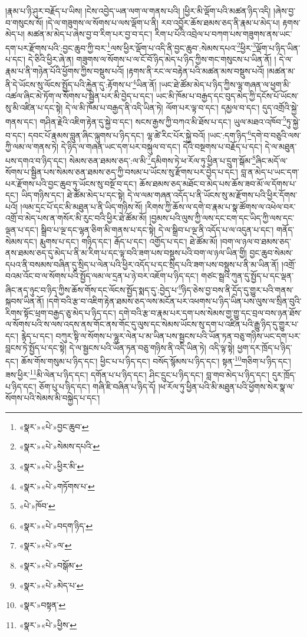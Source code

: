 །རྣམ་པ་ཉི་ཤུར་བརྗོད་པ་ཡིས། །ངེས་འབྱེད་ཡན་ལག་ལ་གནས་པའི། །ཕྱིར་མི་ལྡོག་པའི་མཚན་ཉིད་འདི། །ཞེས་བྱ་བ་གསུངས་སོ། །དེ་ལ་གཟུགས་ལ་སོགས་པ་ལས་ལྡོག་པ་ནི། རབ་འབྱོར་ཆོས་ཐམས་ཅད་ནི་རྣམ་པ་མེད་པ། རྟགས་མེད་པ། མཚན་མ་མེད་པ་ཞེས་བྱ་བ་རིག་པར་བྱ་བ་དང་། རིག་པ་པོའི་འབྲེལ་པ་བཀག་པས་གཟུགས་ནས་ཡང་དག་པར་རྫོགས་པའི་:བྱང་ཆུབ་ཀྱི་བར་\footnote{«སྣར་»«པེ་»བྱང་ཆུབ་}ལས་ཕྱིར་ལྡོག་པ་འདི་ནི་བྱང་ཆུབ་:སེམས་དཔའ་\footnote{«སྣར་»«པེ་»སེམས་དཔའི་}ཕྱིར་\footnote{«སྣར་»«པེ་»ཕྱིར་མི་}ལྡོག་པ་ཉིད་ཡིན་པ་དང་། དེ་ཅིའི་ཕྱིར་ཞེ་ན། གཟུགས་ལ་སོགས་པ་ལ་ངོ་བོ་ཉིད་མེད་པ་ཉིད་ཀྱིས་གང་གསུངས་པ་ཡིན་ནོ། །
དེ་ལ་རྣམ་པ་ནི་གཉེན་པོའི་ཕྱོགས་ཀྱིས་བསྡུས་པའོ། །རྟགས་ནི་རང་ལ་བརྟེན་པའི་མཚན་མས་བསྡུས་པའོ། །མཚན་མ་ནི་དེ་ཡོངས་སུ་ལོངས་སྤྱོད་པའི་རྐྱེན་དུ་:རྟོགས་པ་\footnote{«སྣར་»«པེ་»གཏོགས་པ་}ཡིན་ནོ། །ཡང་ཐེ་ཚོམ་མེད་པ་ཉིད་ཀྱིས་ལྷ་གཞན་ལ་ཕྱག་མི་འཚལ་ཞིང་མེ་ཏོག་ལ་སོགས་པ་སྦྱིན་པར་མི་བྱེད་པ་དང་། ཡང་མི་ཁོམ་པ་བརྒྱད་དང་བུད་མེད་ཀྱི་དངོས་པོ་ཡོངས་སུ་མི་འཛིན་པ་དང་སྟེ། དེ་ལ་མི་ཁོམ་པ་བརྒྱད་ནི་འདི་ཡིན་ཏེ། ལོག་པར་ལྟ་བ་དང་། དམྱལ་བ་དང་། དུད་འགྲོའི་སྐྱེ་གནས་དང་། གཤིན་རྗེའི་འཇིག་རྟེན་དུ་སྐྱེ་བ་དང་། སངས་རྒྱས་ཀྱི་བཀའ་མི་ཐོས་པ་དང་། ཡུལ་མཐའ་འཁོབ་\footnote{«པེ་»ཁོབ་}ཏུ་སྐྱེ་བ་དང་། དབང་པོ་རྣམས་བླུན་ཞིང་ལྐུགས་པ་ཉིད་དང་། ལྷ་ཚེ་རིང་པོར་སྐྱེ་བའོ། །ཡང་:དག་ཉིད་\footnote{«སྣར་»«པེ་»བདག་ཉིད་}དགེ་བ་བཅུའི་ལས་ཀྱི་ལམ་ལ་གནས་ཏེ། དེ་ཉིད་ལ་གཞན་ཡང་དག་པར་བསྐུལ་བ་དང་། དེའི་བསྔགས་པ་བརྗོད་པ་དང་། དེ་ལ་མཐུན་པས་དགའ་བ་ཉིད་དང་། སེམས་ཅན་ཐམས་ཅད་:ལ་མི་\footnote{«སྣར་»«པེ་»ལ་}དམིགས་ཏེ་ཕ་རོལ་ཏུ་ཕྱིན་པ་དྲུག་སྒོམ་\footnote{«སྣར་»«པེ་»བསྒོམ་}ཞིང་མདོ་ལ་སོགས་པ་སྦྱིན་པས་སེམས་ཅན་ཐམས་ཅད་ཀྱི་བསམ་པ་ཡོངས་སུ་རྫོགས་པར་བྱེད་པ་དང་། བླ་ན་མེད་པ་ཡང་དག་པར་རྫོགས་པའི་བྱང་ཆུབ་ཏུ་ཡོངས་སུ་བསྔོ་བ་དང་། ཆོས་ཐམས་ཅད་མཐོང་བ་མེད་པས་ཆོས་ཟབ་མོ་ལ་དོགས་པ་དང་། ཡིད་གཉིས་དང་། ཐེ་ཚོམ་མེད་པ་དང་སྟེ། དེ་ལ་ལམ་གཞན་འདོད་པ་ནི་ཡོངས་སུ་མ་རྫོགས་པའི་ཕྱིར་དོགས་པའོ། །ལམ་དྲང་པོ་དང་མི་མཐུན་པ་ནི་ཡིད་གཉིས་སོ། །རིགས་ཀྱི་ཆོས་ལ་དགེ་བ་རྣམ་པ་སྣ་ཚོགས་ལ་འཕེལ་བར་འགྲོ་བ་མེད་པས་ན་གསོར་མི་རུང་བའི་ཕྱིར་ཐེ་ཚོམ་མོ། །བྱམས་པའི་ལུས་ཀྱི་ལས་དང་ངག་དང་ཡིད་ཀྱི་ལས་དང་ལྡན་པ་དང་། སྒྲིབ་པ་ལྔ་དང་ལྷན་ཅིག་མི་གནས་པ་དང་སྟེ། དེ་ལ་སྒྲིབ་པ་ལྔ་ནི་འདོད་པ་ལ་འདུན་པ་དང་། གནོད་སེམས་དང་། རྨུགས་པ་དང་། གཉིད་དང་། རྒོད་པ་དང་། འགྱོད་པ་དང་། ཐེ་ཚོམ་མོ། །བག་ལ་ཉལ་བ་ཐམས་ཅད་ནས་ཐམས་ཅད་དུ་མེད་པ་ནི་མ་རིག་པ་དང་ལྟ་བའི་ཟག་པས་བསྡུས་པའི་བག་ལ་ཉལ་ཡིན་གྱི། བྱང་ཆུབ་སེམས་དཔའ་ནི་བསམས་བཞིན་དུ་སྲིད་པ་ལེན་པའི་ཕྱིར་འདོད་པ་དང་སྲིད་པའི་ཟག་པས་བསྡུས་པ་ནི་མ་ཡིན་ནོ། །འགྲོ་བའམ་འོང་བ་ལ་སོགས་པའི་སྤྱོད་ལམ་ལ་དྲན་པ་ཉེ་བར་འཇོག་པ་ཉིད་དང་། གཙང་སྦྲའི་ཀུན་དུ་སྤྱོད་པ་དང་ལྡན་ཞིང་ནད་ཉུང་བ་ཉིད་ཀྱིས་ཆོས་གོས་དང་ལོངས་སྤྱོད་སྨད་དུ་:བྱེད་པ་\footnote{«སྣར་»«པེ་»མེད་པ་}ཉིད་ཅེས་བྱ་བས་ནི་དྲོད་དུ་གྱུར་པའི་གནས་སྐབས་ཡིན་ནོ། །དགེ་བའི་རྩ་བ་འཇིག་རྟེན་ཐམས་ཅད་ལས་མངོན་པར་འཕགས་པ་ཉིད་ཡིན་པས་ལུས་ལ་སྲིན་བུའི་རིགས་སྟོང་ཕྲག་བརྒྱད་ཅུ་མེད་པ་ཉིད་དང་། དགེ་བའི་རྩ་བ་རྣམ་པར་དག་པས་སེམས་གྱ་གྱུ་དང་བྲལ་བས་ཉན་ཐོས་ལ་སོགས་པའི་ས་ལས་འདས་ནས་གོང་ནས་གོང་དུ་ལུས་དང་སེམས་ཡོངས་སུ་དག་པ་འཛིན་པའི་རྒྱུ་ཉིད་དུ་གྱུར་པ་དང་། རྙེད་པ་དང་། བཀུར་སྟི་ལ་སོགས་པ་ལྷུར་ལེན་པ་མ་ཡིན་པས་སྦྱངས་པའི་ཡོན་ཏན་བཅུ་གཉིས་ཡང་དག་པར་བླངས་ཏེ་སྤྱོད་པ་དང་སྟེ། དེ་ལ་སྦྱངས་པའི་ཡོན་ཏན་བཅུ་གཉིས་ནི་འདི་ཡིན་ཏེ། འདི་ལྟ་སྟེ། ཕྱག་དར་ཁྲོད་པ་ཉིད་དང་། ཆོས་གོས་གསུམ་པ་ཉིད་དང་། ཕྱིང་པ་པ་ཉིད་དང་། བསོད་སྙོམས་པ་ཉིད་དང་། སྟན་\footnote{«སྣར་»བསྟན་}གཅིག་པ་ཉིད་དང་། ཟས་ཕྱིར་\footnote{«སྣར་»«པེ་»ཕྱིས་}མི་ལེན་པ་ཉིད་དང་། དགོན་པ་པ་ཉིད་དང་། ཤིང་དྲུང་པ་ཉིད་དང་། བླ་གབ་མེད་པ་ཉིད་དང་། དུར་ཁྲོད་པ་ཉིད་དང་། ཅོག་པུ་པ་ཉིད་དང་། གཞི་ཇི་བཞིན་པ་ཉིད་དོ། །ཕ་རོལ་ཏུ་ཕྱིན་པའི་མི་མཐུན་པའི་ཕྱོགས་སེར་སྣ་ལ་སོགས་པའི་སེམས་མི་བསྐྱེད་པ་དང་། 